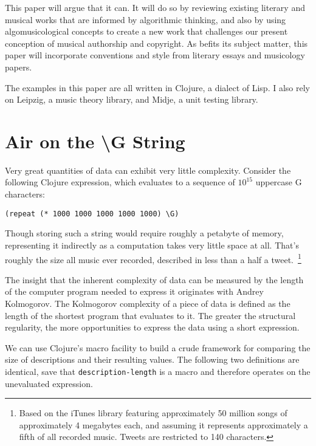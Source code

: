 \documentclass[numbers]{sigplanconf}
\begin{document}
This paper will argue that it can. It will do so by reviewing existing literary and musical works that are informed by algorithmic
thinking, and also by using algomusicological concepts to create a new work that challenges our present conception of musical
authorship and copyright. As befits its subject matter, this paper will incorporate conventions and style from literary essays
and musicology papers.

The examples in this paper are all written in Clojure\cite{Clojure}, a dialect of Lisp. I also rely on Leipzig\cite{Leipzig},
a music theory library, and Midje\cite{Midje}, a unit testing library.

\section{Air on the {\textbackslash}G String\cite{Air on the G String}}
Very great quantities of data can exhibit very little complexity. Consider the following Clojure expression, which
evaluates to a sequence of $10^{15}$ uppercase G characters:

\begin{verbatim}
(repeat (* 1000 1000 1000 1000 1000) \G)
\end{verbatim}

Though storing such a string would require roughly a petabyte of memory, representing it indirectly as a computation
takes very little space at all. That's roughly the size all music ever recorded,
described in less than a half a tweet.~\footnote{Based on the iTunes library featuring approximately 50 million songs
of approximately 4 megabytes each, and assuming it represents approximately a fifth of all recorded music. Tweets are
restricted to 140 characters.}

The insight that the inherent complexity of data can be measured by the length of the computer program needed to express it
originates with Andrey Kolmogorov\cite{On Tables of Random Numbers}. The Kolmogorov complexity of a piece of data is defined
as the length of the shortest program that evaluates to it. The greater the structural regularity, the more opportunities
to express the data using a short expression.

We can use Clojure's macro facility to build a crude framework for comparing the size of descriptions and their
resulting values. The following two definitions are identical, save that \verb|description-length| is a macro and therefore
operates on the unevaluated expression.
\end{document}
